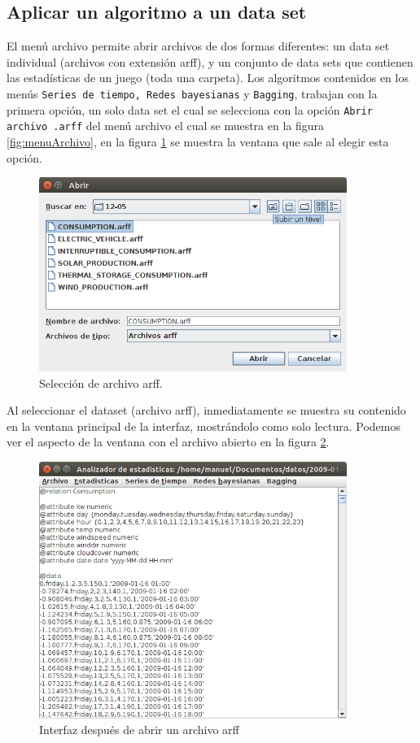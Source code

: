 \subsection{Aplicar un algoritmo a un data set}
El menú archivo permite abrir archivos de dos formas diferentes: un data set individual (archivos con extensión arff), y un conjunto de data sets que contienen las estadísticas de un juego (toda una carpeta). Los algoritmos contenidos en los menús \texttt{Series de tiempo, Redes bayesianas} y \texttt{Bagging}, trabajan con la primera opción, un solo data set el cual se selecciona con la opción \texttt{Abrir archivo .arff} del menú archivo el cual se muestra en la figura \ref{fig:menuArchivo}, en la figura \ref{fig:seleccionArchivo} se muestra la ventana que sale al elegir esta opción.

\begin{figure}[ht]
	\centering
	\includegraphics[width=10cm]{img/seleccionArchivo.png}
	\caption{Selección de archivo arff.}
	\label{fig:seleccionArchivo}
\end{figure}

Al seleccionar el dataset (archivo arff), inmediatamente se muestra su contenido en la ventana principal de la interfaz, mostrándolo como solo lectura. Podemos ver el aspecto de la ventana con el archivo abierto en la figura \ref{fig:archivoAbierto}. 
\begin{figure}[h]
	\centering
	\includegraphics[width=10cm]{img/archivoAbierto.png}
	\caption{Interfaz después de abrir un archivo arff}
	\label{fig:archivoAbierto}
\end{figure}

